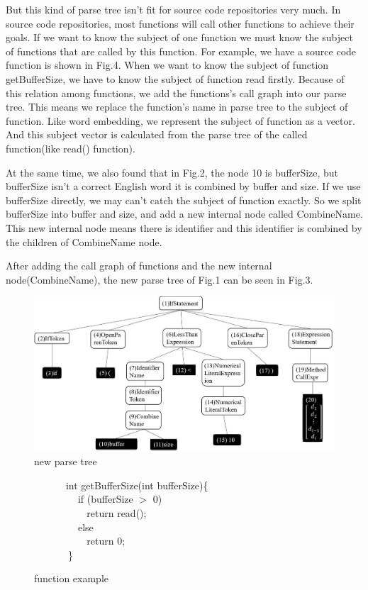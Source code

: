 But this kind of parse tree isn't fit for source code repositories very much. In source code repositories, most functions will call other functions to achieve their goals. If we want to know the subject of one function we must know the subject of functions that are called by this function. For example, we have a source code function is shown in Fig.4. When we want to know the subject of function getBufferSize, we have to know the subject of function read firstly. Because of this relation among functions, we add the functions's call graph into our parse tree. This means we replace the function's name in parse tree to the subject of function. Like word embedding, we represent the subject of function as a vector. And this subject vector is calculated from the parse tree of the called function(like read() function).

At the same time, we also found that in Fig.2, the node 10 is bufferSize, but bufferSize isn't a correct English word it is combined by buffer and size. If we use bufferSize directly, we may can't catch the subject of function exactly. So we split bufferSize into buffer and size, and add a new internal node called CombineName. This new internal node means there is identifier and this identifier is combined by the children of CombineName node.

After adding the call graph of functions and the new internal node(CombineName), the new parse tree of Fig.1 can be seen in Fig.3.
\begin{figure}[!htp]
 \centering
 \includegraphics[width=15cm]{img/parseTree2.pdf}
 \caption{new parse tree}
\end{figure}

\begin{figure}[!htp]

 $~~~~~~~~~~~~~$   int getBufferSize(int bufferSize)\{\\
 $~~~~~~~~~~~~~$  $~~~~$   if (bufferSize $>$ 0)\\
 $~~~~~~~~~~~~~$  $~~~~~~~~$     return read();\\
 $~~~~~~~~~~~~~$  $~~~~$    else\\
 $~~~~~~~~~~~~~$  $~~~~~~~~$      return 0;\\
 $~~~~~~~~~~~~~~$   \}
    \caption{function example}
\end{figure}

